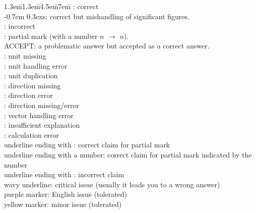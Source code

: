 \documentclass[11pt,pdfa,lastpage,minititle]{MishoNote}
\begin{document}
\begin{DownPara}
\begin{tabbing}
  \kern1.3em\=\kern1.3em\=\kern4.5em\=\kern7em\=\kill
  \>: correct\\
  \kern-0.7em \raise0.3ex\hbox{\small\textsf s}\>: correct but mishandling of significant figures.\\
  \>: incorrect\\
  \>: partial mark (with a number $n$ $\to$ $n$).\\[.5em]
  \textsf{ACCEPT}: a problematic answer but accepted as a correct answer.\\[1em]


  \>\>: unit missing\\
  \>\>: unit handling error\\
  \>\>: unit duplication\\
  \>\>: direction missing\\
  \>\>: direction error\\
  \>\>: direction missing/error\\
  \>\>: vector handling error\\
  \>\>: insufficient explanation\\
  \>\>: calculation error\\[1em]

  underline ending with \>\>\>\>: correct claim for partial mark\\
  underline ending with a number\>\>\>\>: correct claim for partial mark indicated by the number\\
  underline ending with \>\>\>\>: incorrect claim\\[1em]

  wavy underline\>\>\>: critical issue (usually it leads you to a wrong answer)\\
  purple marker\>\>\>: English issue (tolerated)\\
  yellow marker\>\>\>: minor issue (tolerated)\\
\end{tabbing}
\end{DownPara}
\end{document}
